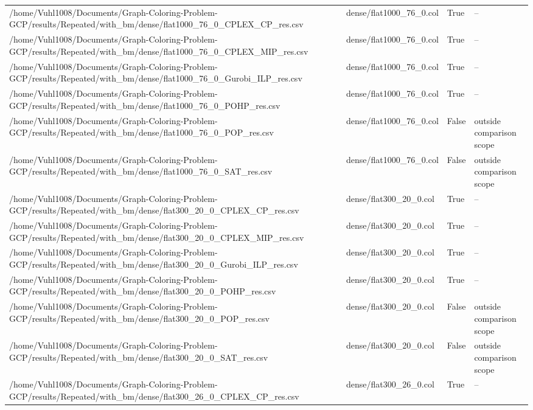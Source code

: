\begin{table}[htbp]
\begin{tabular}{llll}
/home/Vuhl1008/Documents/Graph-Coloring-Problem-GCP/results/Repeated/with\_bm/dense/flat1000\_76\_0\_CPLEX\_CP\_res.csv & dense/flat1000\_76\_0.col & True & -- \\
/home/Vuhl1008/Documents/Graph-Coloring-Problem-GCP/results/Repeated/with\_bm/dense/flat1000\_76\_0\_CPLEX\_MIP\_res.csv & dense/flat1000\_76\_0.col & True & -- \\
/home/Vuhl1008/Documents/Graph-Coloring-Problem-GCP/results/Repeated/with\_bm/dense/flat1000\_76\_0\_Gurobi\_ILP\_res.csv & dense/flat1000\_76\_0.col & True & -- \\
/home/Vuhl1008/Documents/Graph-Coloring-Problem-GCP/results/Repeated/with\_bm/dense/flat1000\_76\_0\_POHP\_res.csv & dense/flat1000\_76\_0.col & True & -- \\
/home/Vuhl1008/Documents/Graph-Coloring-Problem-GCP/results/Repeated/with\_bm/dense/flat1000\_76\_0\_POP\_res.csv & dense/flat1000\_76\_0.col & False & outside comparison scope \\
/home/Vuhl1008/Documents/Graph-Coloring-Problem-GCP/results/Repeated/with\_bm/dense/flat1000\_76\_0\_SAT\_res.csv & dense/flat1000\_76\_0.col & False & outside comparison scope \\
/home/Vuhl1008/Documents/Graph-Coloring-Problem-GCP/results/Repeated/with\_bm/dense/flat300\_20\_0\_CPLEX\_CP\_res.csv & dense/flat300\_20\_0.col & True & -- \\
/home/Vuhl1008/Documents/Graph-Coloring-Problem-GCP/results/Repeated/with\_bm/dense/flat300\_20\_0\_CPLEX\_MIP\_res.csv & dense/flat300\_20\_0.col & True & -- \\
/home/Vuhl1008/Documents/Graph-Coloring-Problem-GCP/results/Repeated/with\_bm/dense/flat300\_20\_0\_Gurobi\_ILP\_res.csv & dense/flat300\_20\_0.col & True & -- \\
/home/Vuhl1008/Documents/Graph-Coloring-Problem-GCP/results/Repeated/with\_bm/dense/flat300\_20\_0\_POHP\_res.csv & dense/flat300\_20\_0.col & True & -- \\
/home/Vuhl1008/Documents/Graph-Coloring-Problem-GCP/results/Repeated/with\_bm/dense/flat300\_20\_0\_POP\_res.csv & dense/flat300\_20\_0.col & False & outside comparison scope \\
/home/Vuhl1008/Documents/Graph-Coloring-Problem-GCP/results/Repeated/with\_bm/dense/flat300\_20\_0\_SAT\_res.csv & dense/flat300\_20\_0.col & False & outside comparison scope \\
/home/Vuhl1008/Documents/Graph-Coloring-Problem-GCP/results/Repeated/with\_bm/dense/flat300\_26\_0\_CPLEX\_CP\_res.csv & dense/flat300\_26\_0.col & True & -- \\

\end{tabular}
\end{table}
